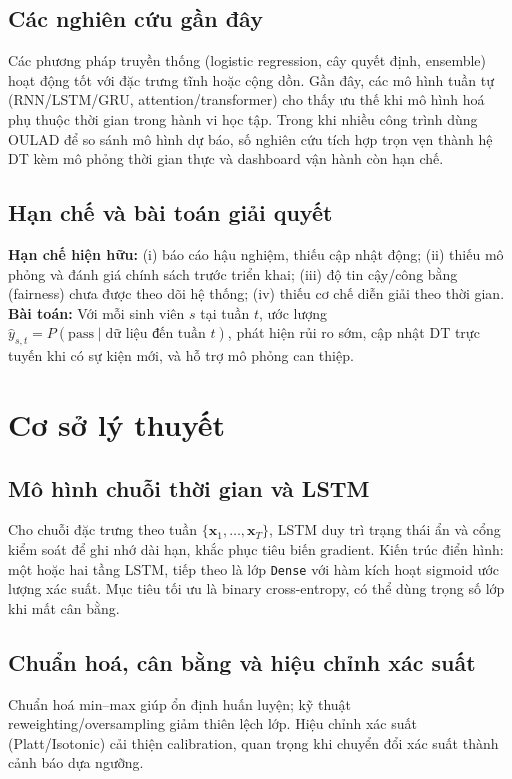 \documentclass[12pt,a4paper]{article}
\newcommand{\dataset}{OULAD}
\begin{document}
\subsection{Các nghiên cứu gần đây}
Các phương pháp truyền thống (logistic regression, cây quyết định, ensemble) hoạt động tốt với đặc trưng tĩnh hoặc cộng dồn. Gần đây, các mô hình tuần tự (RNN/LSTM/GRU, attention/transformer) cho thấy ưu thế khi mô hình hoá phụ thuộc thời gian trong hành vi học tập. Trong khi nhiều công trình dùng \dataset{} để so sánh mô hình dự báo, số nghiên cứu tích hợp trọn vẹn thành hệ DT kèm mô phỏng thời gian thực và dashboard vận hành còn hạn chế.

\subsection{Hạn chế và bài toán giải quyết}
\textbf{Hạn chế hiện hữu:} (i) báo cáo hậu nghiệm, thiếu cập nhật động; (ii) thiếu mô phỏng và đánh giá chính sách trước triển khai; (iii) độ tin cậy/công bằng (fairness) chưa được theo dõi hệ thống; (iv) thiếu cơ chế diễn giải theo thời gian.\\
\textbf{Bài toán:} Với mỗi sinh viên $s$ tại tuần $t$, ước lượng $\hat{y}_{s,t}=P(\text{pass}\mid \text{dữ liệu đến tuần }t)$, phát hiện rủi ro sớm, cập nhật DT trực tuyến khi có sự kiện mới, và hỗ trợ mô phỏng can thiệp.

\section{Cơ sở lý thuyết}
\subsection{Mô hình chuỗi thời gian và LSTM}
Cho chuỗi đặc trưng theo tuần $\{\mathbf{x}_1,\dots,\mathbf{x}_T\}$, LSTM duy trì trạng thái ẩn và cổng kiểm soát để ghi nhớ dài hạn, khắc phục tiêu biến gradient. Kiến trúc điển hình: một hoặc hai tầng LSTM, tiếp theo là lớp \texttt{Dense} với hàm kích hoạt sigmoid ước lượng xác suất. Mục tiêu tối ưu là binary cross-entropy, có thể dùng trọng số lớp khi mất cân bằng.

\subsection{Chuẩn hoá, cân bằng và hiệu chỉnh xác suất}
Chuẩn hoá min--max giúp ổn định huấn luyện; kỹ thuật reweighting/oversampling giảm thiên lệch lớp. Hiệu chỉnh xác suất (Platt/Isotonic) cải thiện calibration, quan trọng khi chuyển đổi xác suất thành cảnh báo dựa ngưỡng.
\end{document}
